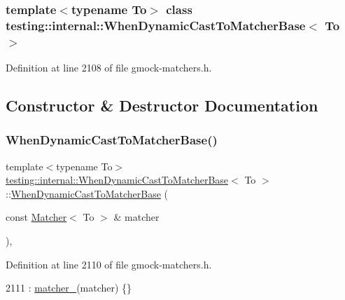 \subsubsection*{template$<$typename To$>$\newline
class testing\+::internal\+::\+When\+Dynamic\+Cast\+To\+Matcher\+Base$<$ To $>$}



Definition at line 2108 of file gmock-\/matchers.\+h.



\subsection{Constructor \& Destructor Documentation}
\mbox{\label{classtesting_1_1internal_1_1WhenDynamicCastToMatcherBase_a7da2a4c7c43d5e18db0a3233a601c8ab}} 
\subsubsection{\texorpdfstring{When\+Dynamic\+Cast\+To\+Matcher\+Base()}{WhenDynamicCastToMatcherBase()}}
{\footnotesize\ttfamily template$<$typename To$>$ \\
\hyperlink{classtesting_1_1internal_1_1WhenDynamicCastToMatcherBase}{testing\+::internal\+::\+When\+Dynamic\+Cast\+To\+Matcher\+Base}$<$ To $>$\+::\hyperlink{classtesting_1_1internal_1_1WhenDynamicCastToMatcherBase}{When\+Dynamic\+Cast\+To\+Matcher\+Base} (\begin{DoxyParamCaption}\item[{const \hyperlink{classtesting_1_1Matcher}{Matcher}$<$ To $>$ \&}]{matcher }\end{DoxyParamCaption})\hspace{0.3cm}{\ttfamily [inline]}, {\ttfamily [explicit]}}



Definition at line 2110 of file gmock-\/matchers.\+h.


\begin{DoxyCode}
2111       : \hyperlink{classtesting_1_1internal_1_1WhenDynamicCastToMatcherBase_a40d697407c960bee8fe3b125f5ac8730}{matcher\_}(matcher) \{\}
\end{DoxyCode}


